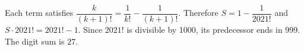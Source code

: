 Each term satisfies $\dfrac{k}{(k+1)!}=\dfrac{1}{k!}-\dfrac{1}{(k+1)!}$. Therefore $S=1-\dfrac{1}{2021!}$ and $S\cdot2021!=2021!-1$. Since $2021!$ is divisible by 1000, its predecessor ends in 999. The digit sum is $\boxed{27}$.
